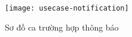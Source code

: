 
\begin{figure}[hbt!]\fontsize{13px}{13px}\selectfont
	\begin{center}	
		\texttt{[image: usecase-notification]}
		\caption{Sơ đồ ca trường hợp thông báo}
	\end{center}
\end{figure}